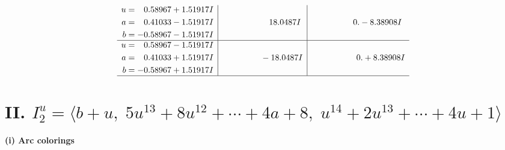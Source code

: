 \documentclass[1p]{elsarticle_modified}
\theoremstyle{definition}
\begin{document}
$$\begin{array}{c|c|c}
\begin{aligned}
u &= \phantom{-}0.58967 + 1.51917 I \\
a &= \phantom{-}0.41033 - 1.51917 I \\
b &= -0.58967 - 1.51917 I\end{aligned}
 & \phantom{-0.000000 -}18.0487 I & \phantom{-0.000000 } 0. - 8.38908 I \\ \hline\begin{aligned}
u &= \phantom{-}0.58967 - 1.51917 I \\
a &= \phantom{-}0.41033 + 1.51917 I \\
b &= -0.58967 + 1.51917 I\end{aligned}
 & \phantom{-0.000000 } -18.0487 I & \phantom{-0.000000 -}0. + 8.38908 I\\
 \hline 
 \end{array}$$\newpage\newpage\renewcommand{\arraystretch}{1}
\centering \section*{II. $I^u_{2}= \langle b+u,\;5 u^{13}+8 u^{12}+\cdots+4 a+8,\;u^{14}+2 u^{13}+\cdots+4 u+1 \rangle$}
\flushleft \textbf{(i) Arc colorings}\\
\end{document}
